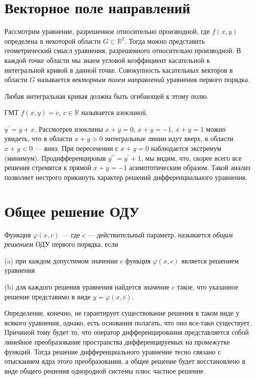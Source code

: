 \section{Векторное поле направлений }
\begin{define*}
Рассмотрим уравнение, разрешенное относительно производной, где $f(x,y)$
определена в некоторой области $G\subset\mathbb{R}^{2}$. Тогда можно
представить геометрический смысл уравнения, разрешенного относительно
производной. В каждой точке области мы знаем угловой коэффициент касательной
к интегральной кривой в данной точке. Совокупность касательных векторов
в области $G$ называется\emph{ векторным полем направлений} уравнения
первого порядка. \end{define*}
\begin{remark*}
Любая интегральная кривая должна быть огибающей к этому полю.
\end{remark*}

\begin{define*}
ГМТ $f(x,y)=c,\ c\in\mathbb{R}$ называется \emph{изоклиной}.\end{define*}
\begin{example}
$y^{\prime}=y+x$. Рассмотрев изоклины $x+y=0$, $x+y=-1$, $x+y=1$
можно увидеть, что в области $x+y>0$ интегральные линии идут вверх,
в области $x+y<0$ --- вниз. При пересечении с $x+y=0$ наблюдается
экстремум (минимум). Продифференцировав $y^{\prime\prime}=y^{\prime}+1$,
мы видим, что, скорее всего все решения стремятся к прямой $x+y=-1$
асимптотическим образом. Такой анализ позволяет нестрого прикинуть
характер решений дифференциального уравнения.
\end{example}

\section{Общее решение ОДУ}
\begin{define*}
Функция $\varphi(x,c)$ --- где $c$ --- действительный параметр,
называется \emph{общим решением} ОДУ первого порядка, если

(a) при каждом допустимом значении $c$ функция $\varphi(x,c)$ является
решением уравнения

(b) для каждого решения уравнения найдется значение $c$ такое, что
указанное решение представимо в виде $y=\varphi(x,c)$.\end{define*}
\begin{remark*}
Определение, конечно, не гарантирует существование решения в таком
виде у всякого уравнения, однако, есть основания полагать, что оно
все-таки существует. Причиной тому будет то, что оператор дифференцирования
представляется собой линейное преобразование пространства дифференцируемых
на промежутке функций. Тогда решение дифференциального уравнение тесно
связано с отысканием ядра этого преобразования, а общее решение будет
восстановлено в виде общего решения однородной системы плюс частное
решение.
\end{remark*}

